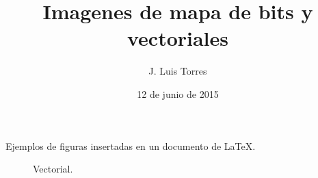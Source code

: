 \documentclass[letterpaper,12pt]{article}
\title{Imagenes de mapa de bits y vectoriales}
\author{J. Luis Torres}
\date{12 de junio de 2015}
\begin{document}
\maketitle

Ejemplos de figuras insertadas en un documento de \LaTeX{}.


\begin{comment}
\begin{figure}[h!]
\centering
\texttt{[image: Floral2.jpg]}
\caption{Mapa de bits.}
\end{figure}
\end{comment}

\begin{figure}[h!]
\centering
\caption{Vectorial.}
\end{figure}
\end{document}
